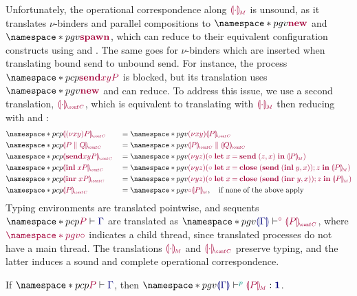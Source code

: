 Unfortunately, the operational correspondence along $\tm{\cpgvM{\cdot}}$ is unsound, as it translates $\nu$-binders and parallel compositions to $\pgv{\tm{\new}}$ and $\pgv{\tm{\spawn}}$, which can reduce to their equivalent configuration constructs using  and . The same goes for $\nu$-binders which are inserted when translating bound send to unbound send. For instance, the process $\pcp{\tm{\send{x}{y}{P}}}$ is blocked, but its translation uses $\pgv{\tm{\new}}$ and can reduce. To address this issue, we use a second translation, $\tm{\cpgvC{\cdot}}$, which is equivalent to translating with $\tm{\cpgvM{\cdot}}$ then reducing with  and :
\begin{align*}
  &\pcp{\tm{\cpgvC{\res{x}{y}{P}}}}
  &&= \pgv{\tm{\res{x}{y}{\cpgvC{P}}}}
  \\
  &\pcp{\tm{\cpgvC{\ppar{P}{Q}}}}
  &&= \pgv{\tm{\ppar{\cpgvC{P}}{\cpgvC{Q}}}}
  \\
  &\pcp{\tm{\cpgvC{\send{x}{y}{P}}}}
  &&= \pgv{\tm{\res{y}{z}{(\child\;\letbind{x}{\send\;\pair{z}{x}}{\cpgvM{P}})}}}
  \\
  &\pcp{\tm{\cpgvC{\inl{x}{P}}}}
  &&= \pgv{\tm{\res{y}{z}{(\child\;\letbind{x}{\andthen{\close\;(\send\;\pair{\inl{y}}{x})}{z}}{\cpgvM{P}})}}}
  \\
  &\pcp{\tm{\cpgvC{\inr{x}{P}}}}
  &&= \pgv{\tm{\res{y}{z}{(\child\;\letbind{x}{\andthen{\close\;(\send\;\pair{\inr{y}}{x})}{z}}{\cpgvM{P}})}}}
  \\
  &\pcp{\tm{\cpgvC{P}}}
  &&= \pgv{\tm{\child{\cpgvM{P}}}},\quad\text{if none of the above apply}
\end{align*}
Typing environments are translated pointwise, and sequents $\pcp{\seq{P}{\ty{\Gamma}}}$ are translated as $\pgv{\cseq[\child]{\ty{\cpgvT{\ty{\Gamma}}}}{\cpgvC{P}}}$, where $\tm{\pgv{\child}}$ indicates a child thread, since translated processes do not have a main thread.
The translations $\tm{\cpgvM{\cdot}}$ and $\tm{\cpgvC{\cdot}}$ preserve typing, and the latter induces a sound and complete operational correspondence.

\begin{lemma}%
  \label{lem:pcp-to-pgv-terms-preservation}
  If $\pcp{\seq{P}{\ty{\Gamma}}}$, then $\pgv{\tseq[\cs{p}]{\ty{\cpgvT{\Gamma}}}{\cpgvM{P}}{\tyunit}}$.
\end{lemma}


